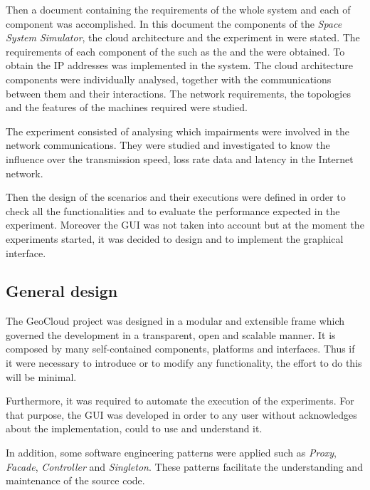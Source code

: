 Then a document containing the requirements of the whole system and each of
component was accomplished. In this document the components of the
\emph{Space System Simulator},
the cloud architecture and the experiment in \pl were stated. The requirements
of each component of
the \sss such as the \satss and the \gsss were obtained. To obtain the \ac{IP}
addresses was implemented in the system. The cloud architecture components were
individually analysed, together with the communications between them and their
interactions. The network requirements, the topologies and the features of the
machines required were studied.
  
The \pl experiment consisted of analysing which impairments
were involved in the network communications. They were studied and investigated to
know the influence over the transmission speed, loss rate data and latency in
the Internet network.

Then the design of the scenarios and their executions were defined in order to
check all the functionalities and to evaluate the performance expected in the experiment.
Moreover the \ac{GUI} was not taken into account but at the moment the
experiments started, it was decided to design and to implement the graphical interface.


\subsection{General design}

The GeoCloud project was designed in a modular and extensible
frame which governed the development in a transparent, open and scalable
manner. It is composed by many self-contained components, platforms and
interfaces. Thus if it were
necessary to introduce or to modify any functionality, the effort to do this will
be minimal.

Furthermore, it was required to automate the execution of the
experiments. For that purpose, the \ac{GUI} was developed in order to any user without acknowledges about the implementation, could to use and understand it.

In addition, some software engineering patterns were applied such as \emph{Proxy},
\emph{Facade}, \emph{Controller} and \emph{Singleton}. These patterns
facilitate the understanding and maintenance of the source code.

